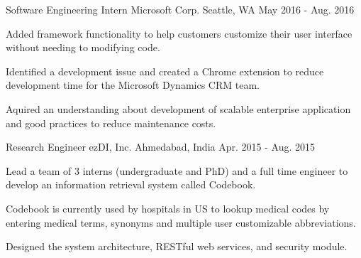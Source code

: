 \begin{cventries}
  \cventry
    {Software Engineering Intern} %
    {Microsoft Corp.} %
    {Seattle, WA} %
    {May 2016 - Aug. 2016} %
    {
      \begin{cvitems} %
        \item Added framework functionality to help customers customize their user interface without needing to modifying code.
        \item Identified a development issue and created a Chrome extension to reduce development time for the Microsoft Dynamics CRM team.
        \item Aquired an understanding about development of scalable enterprise application and good practices to reduce maintenance costs.
      \end{cvitems}
    }

  \cventry
    {Research Engineer} %
    {ezDI, Inc.} %
    {Ahmedabad, India} %
    {Apr. 2015 - Aug. 2015} %
    {
      \begin{cvitems} %
      	\item Lead a team of 3 interns (undergraduate and PhD) and a full time engineer to develop an information retrieval system called Codebook.
      	\item Codebook is currently used by hospitals in US to lookup medical codes by entering medical terms, synonyms and multiple user customizable abbreviations.
      	\item Designed the system architecture, RESTful web services, and security module.
      \end{cvitems}
    }

\end{cventries}
